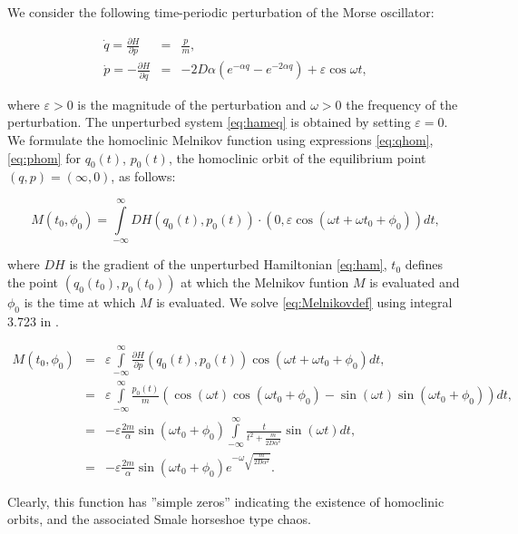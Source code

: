 \documentclass{ws-ijbc}
\begin{document}
We consider the following time-periodic perturbation of the Morse oscillator:

\begin{eqnarray}
\dot{q}  =  \frac{\partial H}{\partial p} & = &  \frac{p}{m}, \nonumber \\
\dot{p}  = - \frac{\partial H}{\partial q} & = & -2D \alpha \left(e^{-\alpha q} - e^{-2\alpha q}  \right) +\varepsilon \cos{\omega t},
\label{eq:perteq}
\end{eqnarray}

\noindent
where $\varepsilon>0$ is the magnitude of the perturbation and $\omega>0$ the frequency of the perturbation. The unperturbed system \eqref{eq:hameq} is obtained by setting $\varepsilon=0$. We formulate the homoclinic Melnikov function using expressions \eqref{eq:qhom}, \eqref{eq:phom} for $q_0(t)$, $p_0(t)$, the homoclinic orbit of the equilibrium point $(q,p)=(\infty,0)$, as follows:

\begin{equation}
    M(t_0,\phi_0)=\int\limits_{-\infty}^{\infty} DH(q_0(t),p_0(t))\cdot(0, \varepsilon \cos(\omega t+\omega t_0+\phi_0)) dt,
\label{eq:Melnikovdef}
\end{equation}

\noindent
where $DH$ is the gradient of the unperturbed Hamiltonian \eqref{eq:ham}, $t_0$ defines the point $(q_0(t_0),p_0(t_0))$ at which the Melnikov funtion $M$ is evaluated and $\phi_0$ is the time at which $M$ is evaluated. We solve \eqref{eq:Melnikovdef} using integral 3.723 in \cite{gradshteyn1980table}.

\begin{eqnarray}
    M(t_0,\phi_0)&=&\varepsilon \int\limits_{-\infty}^{\infty} \frac{\partial H}{\partial p}(q_0(t),p_0(t)) \cos(\omega t+\omega t_0+\phi_0) dt,\nonumber \\
                &=& \varepsilon \int\limits_{-\infty}^{\infty} \frac{p_0(t)}{m} \left( \cos(\omega t)\cos(\omega t_0+\phi_0)-\sin(\omega t)\sin(\omega t_0+\phi_0) \right) dt, \nonumber\\
                &=& -\varepsilon \frac{2m}{\alpha} \sin(\omega t_0+\phi_0) \int\limits_{-\infty}^{\infty} \frac{t}{t^2+\frac{m}{2D\alpha^2}} \sin(\omega t) dt, \nonumber\\
                &=& -\varepsilon \frac{2m}{\alpha} \sin(\omega t_0+\phi_0) e^{-\omega\sqrt{\frac{m}{2D\alpha^2}}}.
\label{eq:Melnikovsol}
\end{eqnarray}

\noindent
Clearly, this function has ''simple zeros'' indicating the existence of homoclinic orbits, and the associated Smale horseshoe type chaos.
\end{document}
